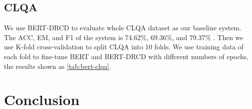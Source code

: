 \documentclass[12pt]{article}
\begin{document}
\subsection{CLQA}
We use BERT-DRCD to evaluate whole CLQA dataset as our baseline system. The ACC, EM, and F1 of the system is 74.62\%, 69.36\%, and 79.37\% . Then we use K-fold cross-validation to split CLQA into 10 folds. We use training data of each fold to fine-tune BERT and BERT-DRCD with different numbers of epochs, the results shown as \ref{tab:bert-clqa}.

\section{Conclusion}

\newpage



\end{document}
